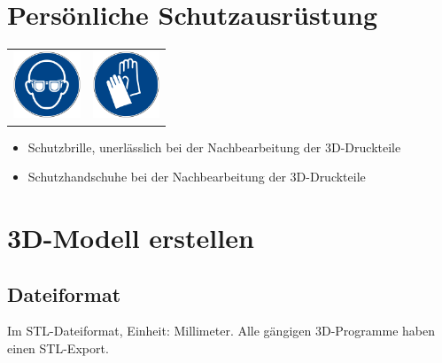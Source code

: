 \documentclass{\basedir/fablab-document}
\begin{document}
\section{Persönliche Schutzausrüstung}
\begin{table}[h]
	\centering
	\begin{tabular}{cc}
		
	 \includegraphics[width=2cm]{bilder/gaugenschutz.png}  & \includegraphics[width=2cm]{bilder/ghandschuh.png} \\
	\end{tabular}
\end{table}

\begin{itemize}
	\item Schutzbrille, unerlässlich bei der Nachbearbeitung der 3D-Druckteile \\
	\item Schutzhandschuhe bei der Nachbearbeitung der 3D-Druckteile\\
\end{itemize}
	\newpage

	
	\renewcommand{\contentsname}{Inhaltsverzeichnis / Arbeitsablauf}
	\setcounter{tocdepth}{2}
	\tableofcontents
	\newpage
	
	\section{3D-Modell erstellen}
	\subsection{Dateiformat}
	
	Im STL-Dateiformat, Einheit: Millimeter. Alle gängigen 3D-Programme haben einen STL-Export.
	
\end{document}
